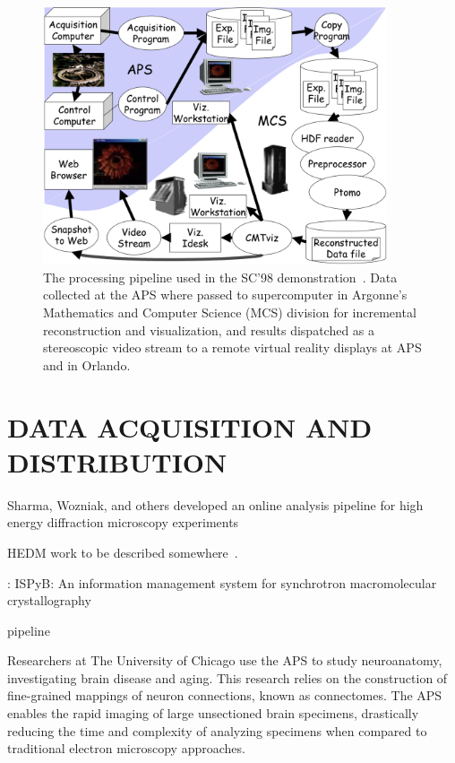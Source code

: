 \documentclass{aip-cp}
\newcommand\ian[1]{}
\newcommand\ryan[1]{}
\newcommand\ian[1]{{\color{red}[Ian: #1]}}
\newcommand\ryan[1]{{\color{green}[Ryan: #1]}}
\begin{document}
\begin{figure}[h]
  \centerline{\includegraphics[width=4in]{Figs/APS-Fig.png}}
  \caption{The processing pipeline used in the SC'98 demonstration~\cite{von2000real}. Data collected at the APS 
  where passed to supercomputer in Argonne's Mathematics and Computer Science (MCS) division for
  incremental reconstruction and visualization, and results dispatched as a stereoscopic
  video stream to a remote virtual reality displays at APS and in Orlando.\label{fig:sc98}}
\end{figure}

\section{DATA ACQUISITION AND DISTRIBUTION}

Sharma, Wozniak, and others developed an online analysis pipeline for high energy diffraction microscopy
experiments 

HEDM work to be described somewhere~\cite{park2015high}.

\cite{delageniere2011ispyb}: 
ISPyB: An information management system for synchrotron macromolecular crystallography

pipeline~\cite{wozniak2015big}


\ian{Petrel should get a mention.}

\ryan{Not sure if the plan was to discuss this. Feel free to cut it all.}

Researchers at The University of Chicago use the APS to study neuroanatomy, investigating brain 
disease and aging. This research relies on the construction of 
fine-grained mappings of neuron connections, known as connectomes. The APS enables the rapid 
imaging of large unsectioned brain specimens, drastically reducing the time and complexity of 
analyzing specimens when compared to traditional electron microscopy approaches.
\end{document}
